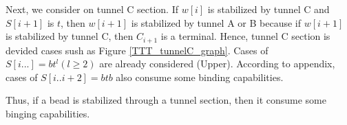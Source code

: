 \documentclass[a4,dvipdfmx,11pt]{article}
\theoremstyle{definition}
\begin{document}
Next, we consider on tunnel C section. If $w[i]$ is stabilized by tunnel C and $S[i+1]$ is $t$, then $w[i+1]$ is stabilized by tunnel A or B because if $w[i+1]$ is stabilized by tunnel C, then $C_{i+1}$ is a terminal. Hence, tunnel C section is devided cases sush as Figure \ref{TTT_tunnelC_graph}. Cases of $S[i...] = bt^l (l \geq 2)$ are already considered (Upper). According to appendix, cases of $S[i..i+2] = btb$ also consume some binding capabilities.


Thus, if a bead is stabilized through a tunnel section, then it consume some binging capabilities.









\end{document}
